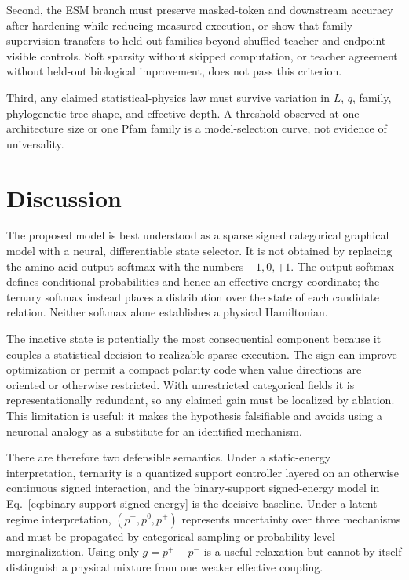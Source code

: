 \documentclass[10pt,twocolumn]{article}
\newcommand{\1}{\mathbf 1}
\theoremstyle{remark}
\begin{document}
Second, the ESM branch must preserve masked-token and downstream accuracy after hardening while
reducing measured execution, or show that family supervision transfers to held-out families beyond
shuffled-teacher and endpoint-visible controls.  Soft sparsity without skipped computation, or
teacher agreement without held-out biological improvement, does not pass this criterion.

Third, any claimed statistical-physics law must survive variation in $L$, $q$, family, phylogenetic
tree shape, and effective depth.  A threshold observed at one architecture size or one Pfam family
is a model-selection curve, not evidence of universality.

\section{Discussion}

The proposed model is best understood as a sparse signed categorical graphical model with a
neural, differentiable state selector.  It is not obtained by replacing the amino-acid output
softmax with the numbers $-1,0,+1$.  The output softmax defines conditional probabilities and hence
an effective-energy coordinate; the ternary softmax instead places a distribution over the state
of each candidate relation.  Neither softmax alone establishes a physical Hamiltonian.

The inactive state is potentially the most consequential component because it couples a
statistical decision to realizable sparse execution.  The sign can improve optimization or permit
a compact polarity code when value directions are oriented or otherwise restricted.  With
unrestricted categorical fields it is representationally redundant, so any claimed gain must be
localized by ablation.  This limitation is useful: it makes the hypothesis falsifiable and avoids
using a neuronal analogy as a substitute for an identified mechanism.

There are therefore two defensible semantics.  Under a static-energy interpretation, ternarity is
a quantized support controller layered on an otherwise continuous signed interaction, and the
binary-support signed-energy model in Eq.~\ref{eq:binary-support-signed-energy} is the decisive
baseline.  Under a latent-regime interpretation, $(p^-,p^0,p^+)$ represents uncertainty over three
mechanisms and must be propagated by categorical sampling or probability-level marginalization.
Using only $g=p^+-p^-$ is a useful relaxation but cannot by itself distinguish a physical mixture
from one weaker effective coupling.
\end{document}
